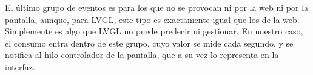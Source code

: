 El último grupo de eventos es para los que no se provocan ni por la web ni por la pantalla, aunque, para LVGL, este tipo es exactamente igual que los de la web. Simplemente es algo que LVGL no puede predecir ni gestionar. En nuestro caso, el consumo entra dentro de este grupo, cuyo valor se mide cada segundo, y se notifica al hilo controlador de la pantalla, que a su vez lo representa en la interfaz.